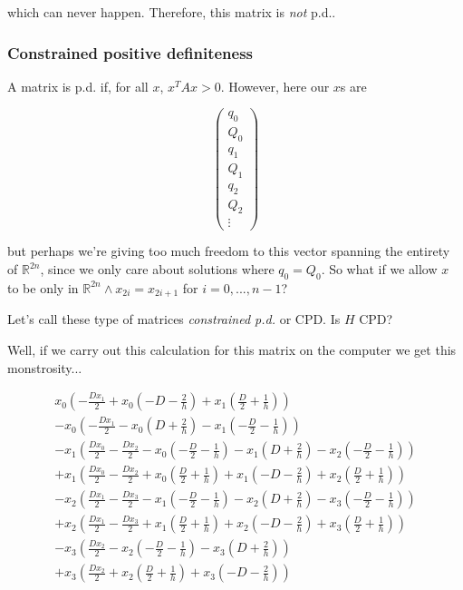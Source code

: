 \documentclass{article}
\begin{document}
which can never happen. Therefore, this matrix is \emph{not} p.d..

\subsubsection{Constrained positive definiteness}

A matrix is p.d. if, for all $x$, $x^T A x > 0$. However, here our $x$s are 

\[
    \begin{pmatrix}
        q_0 \\
        Q_0 \\
        q_1 \\
        Q_1 \\
        q_2 \\
        Q_2 \\
        \vdots
    \end{pmatrix}
\]

but perhaps we're giving too much freedom to this vector spanning the entirety of $\mathbb{R}^{2n}$, since we only care about solutions where $q_0 = Q_0$. So what if we allow $x$ to be only in $\mathbb{R}^{2n} \land x_{2i} = x_{2i+1}$ for $i = 0, ..., n-1$? 

Let's call these type of matrices \emph{constrained p.d.} or CPD. Is $H$ CPD?

Well, if we carry out this calculation for this matrix on the computer we get this monstrosity...

\[
\begin{aligned}    
x_{0} \left(- \frac{D x_{1}}{2} + x_{0} \left(- D - \frac{2}{h}\right) + x_{1} \left(\frac{D}{2} + \frac{1}{h}\right)\right) \\ - x_{0} \left(- \frac{D x_{1}}{2} - x_{0} \left(D + \frac{2}{h}\right) - x_{1} \left(- \frac{D}{2} - \frac{1}{h}\right)\right) \\ - x_{1} \left(\frac{D x_{0}}{2} - \frac{D x_{2}}{2} - x_{0} \left(- \frac{D}{2} - \frac{1}{h}\right) - x_{1} \left(D + \frac{2}{h}\right) - x_{2} \left(- \frac{D}{2} - \frac{1}{h}\right)\right) \\ + x_{1} \left(\frac{D x_{0}}{2} - \frac{D x_{2}}{2} + x_{0} \left(\frac{D}{2} + \frac{1}{h}\right) + x_{1} \left(- D - \frac{2}{h}\right) + x_{2} \left(\frac{D}{2} + \frac{1}{h}\right)\right) \\ - x_{2} \left(\frac{D x_{1}}{2} - \frac{D x_{3}}{2} - x_{1} \left(- \frac{D}{2} - \frac{1}{h}\right) - x_{2} \left(D + \frac{2}{h}\right) - x_{3} \left(- \frac{D}{2} - \frac{1}{h}\right)\right) \\ + x_{2} \left(\frac{D x_{1}}{2} - \frac{D x_{3}}{2} + x_{1} \left(\frac{D}{2} + \frac{1}{h}\right) + x_{2} \left(- D - \frac{2}{h}\right) + x_{3} \left(\frac{D}{2} + \frac{1}{h}\right)\right) \\ - x_{3} \left(\frac{D x_{2}}{2} - x_{2} \left(- \frac{D}{2} - \frac{1}{h}\right) - x_{3} \left(D + \frac{2}{h}\right)\right) \\ + x_{3} \left(
\frac{D x_{2}}{2} + x_{2} \left(\frac{D}{2} + \frac{1}{h}\right) + x_{3} \left(- D - \frac{2}{h}\right)\right)
\end{aligned}
\]
\end{document}
